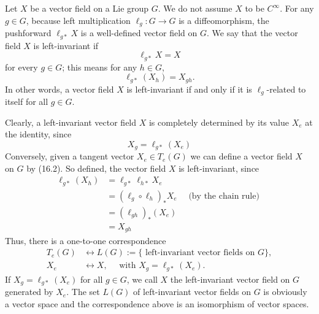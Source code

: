 \documentclass{amsart}
\theoremstyle{plain}
\theoremstyle{definition}
\theoremstyle{remark}
\begin{document}
Let $X$ be a vector field on a Lie group $G$. We do not assume $X$ to be $C^{\infty}$. For any $g \in G$, because left multiplication $\ell_g: G \rightarrow G$ is a diffeomorphism, the pushforward $\ell_{g *} X$ is a well-defined vector field on $G$. We say that the vector field $X$ is left-invariant if
\[
\ell_{g *} X=X
\]
for every $g \in G$; this means for any $h \in G$,
\[
\ell_{g *}\left(X_h\right)=X_{g h} .
\]
In other words, a vector field $X$ is left-invariant if and only if it is $\ell_g$-related to itself for all $g \in G$.

Clearly, a left-invariant vector field $X$ is completely determined by its value $X_e$ at the identity, since
\[
X_g=\ell_{g *}\left(X_e\right)
\]
Conversely, given a tangent vector $X_e \in T_e(G)$ we can define a vector field $X$ on $G$ by (16.2). So defined, the vector field $X$ is left-invariant, since
\[
\begin{aligned}
\ell_{g *}\left(X_h\right) & =\ell_{g *} \ell_{h *} X_e \\
& =\left(\ell_g \circ \ell_h\right)_* X_e \quad \text { (by the chain rule) } \\
& =\left(\ell_{g h}\right)_*\left(X_e\right) \\
& =X_{g h}
\end{aligned}
\]
Thus, there is a one-to-one correspondence
\[
\begin{aligned}
T_e(G) & \leftrightarrow L(G):=\{\text { left-invariant vector fields on } G\}, \\
X_e & \leftrightarrow X, \quad \text { with } X_g=\ell_{g *}\left(X_e\right) .
\end{aligned}
\]
If $X_g=\ell_{g *}\left(X_e\right)$ for all $g \in G$, we call $X$ the left-invariant vector field on $G$ generated by $X_e$. The set $L(G)$ of left-invariant vector fields on $G$ is obviously a vector space and the correspondence above is an isomorphism of vector spaces.
\end{document}
